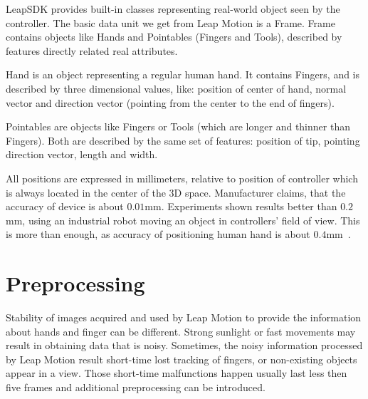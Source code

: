 LeapSDK provides built-in classes representing real-world object seen by the controller. The basic data unit we get from Leap Motion is a Frame. Frame contains objects like Hands and Pointables (Fingers and Tools), described by features directly related real attributes.

Hand is an object representing a regular human hand. It contains Fingers, and is described by three dimensional values, like: position of center of hand, normal vector and direction vector (pointing from the center to the end of fingers). 

Pointables are objects like Fingers or Tools (which are longer and thinner than Fingers). Both are described by the same set of features: position of tip, pointing direction vector, length and width.


All positions are expressed in millimeters, relative to position of controller which is always located in the center of the 3D space. Manufacturer claims, that the accuracy of device is about $0.01$mm. Experiments shown results better than $0.2$mm, using an industrial robot moving an object in controllers' field of view. This is more than enough, as accuracy of positioning human hand is about $0.4$mm~\cite{lmAN}.

\section{Preprocessing} \label{PreprocessingSection}

Stability of images acquired and used by Leap Motion to provide the information about hands and finger can be different.
Strong sunlight or fast movements may result in obtaining data that is noisy.
Sometimes, the noisy information processed by Leap Motion result short-time lost tracking of fingers, or non-existing objects appear in a view. 
Those short-time malfunctions happen usually last less then five frames and additional preprocessing can be introduced. 

